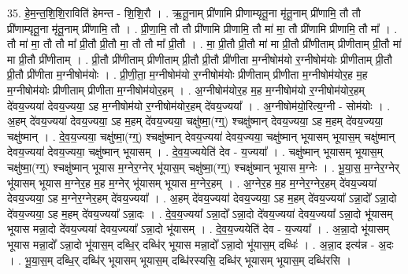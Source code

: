 \documentclass[17pt]{extarticle}
\begin{document}
35. हे॒म॒न्त॒शि॒शि॒राविति॑ हेमन्त - शि॒शि॒रौ । . ऋ॒तू॒नाम् प्री॑णामि प्रीणाम्यृतू॒ना मृ॑तू॒नाम् प्री॑णामि॒ तौ तौ प्री॑णाम्यृतू॒ना मृ॑तू॒नाम् प्री॑णामि॒ तौ । . प्री॒णा॒मि॒ तौ तौ प्री॑णामि प्रीणामि॒ तौ मा॑ मा॒ तौ प्री॑णामि प्रीणामि॒ तौ मा᳚ । . तौ मा॑ मा॒ तौ तौ मा᳚ प्री॒तौ प्री॒तौ मा॒ तौ तौ मा᳚ प्री॒तौ । . मा॒ प्री॒तौ प्री॒तौ मा॑ मा प्री॒तौ प्री॑णीताम् प्रीणीताम् प्री॒तौ मा॑ मा प्री॒तौ प्री॑णीताम् । . प्री॒तौ प्री॑णीताम् प्रीणीताम् प्री॒तौ प्री॒तौ प्री॑णीता म॒ग्नीषोम॑यो र॒ग्नीषोम॑योः प्रीणीताम् प्री॒तौ प्री॒तौ प्री॑णीता म॒ग्नीषोम॑योः । . प्री॒णी॒ता॒ म॒ग्नीषोम॑यो र॒ग्नीषोम॑योः प्रीणीताम् प्रीणीता म॒ग्नीषोम॑योर॒ह म॒ह म॒ग्नीषोम॑योः प्रीणीताम् प्रीणीता म॒ग्नीषोम॑योर॒हम् । . अ॒ग्नीषोम॑योर॒ह म॒ह म॒ग्नीषोम॑यो र॒ग्नीषोम॑योर॒हम् दे॑वय॒ज्यया॑ देवय॒ज्यया॒ ऽह म॒ग्नीषोम॑यो र॒ग्नीषोम॑योर॒हम् दे॑वय॒ज्यया᳚ । . अ॒ग्नीषोम॑यो॒रित्य॒ग्नी - सोम॑योः । . अ॒हम् दे॑वय॒ज्यया॑ देवय॒ज्यया॒ ऽह म॒हम् दे॑वय॒ज्यया॒ चक्षु॑ष्मा॒(ग्ग्॒) श्चक्षु॑ष्मान् देवय॒ज्यया॒ ऽह म॒हम् दे॑वय॒ज्यया॒ चक्षु॑ष्मान् । . दे॒व॒य॒ज्यया॒ चक्षु॑ष्मा॒(ग्ग्॒) श्चक्षु॑ष्मान् देवय॒ज्यया॑ देवय॒ज्यया॒ चक्षु॑ष्मान् भूयासम् भूयास॒म् चक्षु॑ष्मान् देवय॒ज्यया॑ देवय॒ज्यया॒ चक्षु॑ष्मान् भूयासम् । . दे॒व॒य॒ज्ययेति॑ देव - य॒ज्यया᳚ । . चक्षु॑ष्मान् भूयासम् भूयास॒म् चक्षु॑ष्मा॒(ग्ग्॒) श्चक्षु॑ष्मान् भूयास म॒ग्नेर॒ग्नेर् भू॑यास॒म् 
चक्षु॑ष्मा॒(ग्ग्॒) श्चक्षु॑ष्मान् भूयास म॒ग्नेः । . भू॒या॒स॒ म॒ग्नेर॒ग्नेर् भू॑यासम् भूयास म॒ग्नेर॒ह म॒ह म॒ग्नेर् भू॑यासम् भूयास म॒ग्नेर॒हम् । . अ॒ग्नेर॒ह म॒ह म॒ग्नेर॒ग्नेर॒हम् दे॑वय॒ज्यया॑ देवय॒ज्यया॒ ऽह म॒ग्नेर॒ग्नेर॒हम् दे॑वय॒ज्यया᳚ । . अ॒हम् दे॑वय॒ज्यया॑ देवय॒ज्यया॒ ऽह म॒हम् दे॑वय॒ज्यया᳚ ऽन्ना॒दो᳚ ऽन्ना॒दो दे॑वय॒ज्यया॒ ऽह म॒हम् दे॑वय॒ज्यया᳚ ऽन्ना॒दः । . दे॒व॒य॒ज्यया᳚ ऽन्ना॒दो᳚ ऽन्ना॒दो दे॑वय॒ज्यया॑ देवय॒ज्यया᳚ ऽन्ना॒दो भू॑यासम् भूयास मन्ना॒दो दे॑वय॒ज्यया॑ देवय॒ज्यया᳚ ऽन्ना॒दो भू॑यासम् । . दे॒व॒य॒ज्ययेति॑ देव - य॒ज्यया᳚ । . अ॒न्ना॒दो भू॑यासम् भूयास मन्ना॒दो᳚ ऽन्ना॒दो भू॑यास॒म् दब्धि॒र् दब्धि॑र् भूयास मन्ना॒दो᳚ ऽन्ना॒दो भू॑यास॒म् दब्धिः॑ । . अ॒न्ना॒द इत्य॑न्न - अ॒दः । . भू॒या॒स॒म् दब्धि॒र् दब्धि॑र् भूयासम् भूयास॒म् दब्धि॑रस्यसि॒ दब्धि॑र् भूयासम् भूयास॒म् दब्धि॑रसि । \newline
\pagebreak
{}
\end{document}
